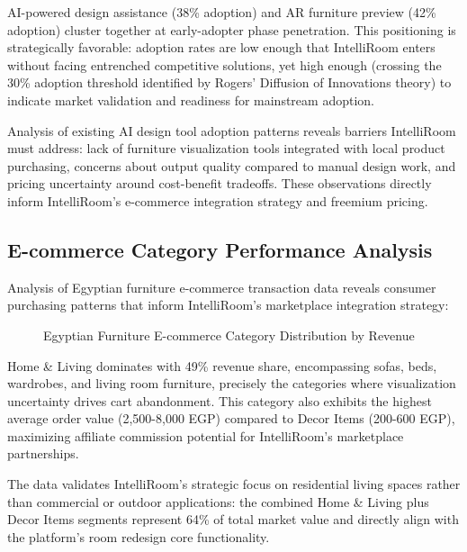 AI-powered design assistance (38\% adoption) and AR furniture preview (42\% adoption) cluster together at early-adopter phase penetration. This positioning is strategically favorable: adoption rates are low enough that IntelliRoom enters without facing entrenched competitive solutions, yet high enough (crossing the 30\% adoption threshold identified by Rogers' Diffusion of Innovations theory) to indicate market validation and readiness for mainstream adoption.

Analysis of existing AI design tool adoption patterns reveals barriers IntelliRoom must address: lack of furniture visualization tools integrated with local product purchasing, concerns about output quality compared to manual design work, and pricing uncertainty around cost-benefit tradeoffs. These observations directly inform IntelliRoom's e-commerce integration strategy and freemium pricing.

\subsection{E-commerce Category Performance Analysis}

Analysis of Egyptian furniture e-commerce transaction data reveals consumer purchasing patterns that inform IntelliRoom's marketplace integration strategy:

\begin{figure}[htbp]
\centering
{}
\caption{Egyptian Furniture E-commerce Category Distribution by Revenue}
\label{fig:ecommerce_categories}
\end{figure}

Home \& Living dominates with 49\% revenue share, encompassing sofas, beds, wardrobes, and living room furniture, precisely the categories where visualization uncertainty drives cart abandonment. This category also exhibits the highest average order value (2,500-8,000 EGP) compared to Decor Items (200-600 EGP), maximizing affiliate commission potential for IntelliRoom's marketplace partnerships.

The data validates IntelliRoom's strategic focus on residential living spaces rather than commercial or outdoor applications: the combined Home \& Living plus Decor Items segments represent 64\% of total market value and directly align with the platform's room redesign core functionality.

